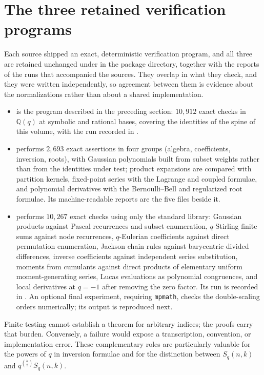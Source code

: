 \documentclass[11pt,a4paper,oneside,openany]{book}
\theoremstyle{definition}
\theoremstyle{remark}
\newcommand{\Q}{\mathbb Q}
\begin{document}
\section{The three retained verification programs}
\label{q3:sec:verifiers}
Each source shipped an exact, deterministic verification program, and all
three are retained unchanged under  in the package
directory, together with the reports of the runs that accompanied the
sources. They overlap in what they check, and they were written
independently, so agreement between them is evidence about the
normalizations rather than about a shared implementation.
\begin{itemize}
\item {} is the program
 described in the preceding section: \(10{,}912\) exact checks in
 \(\Q(q)\) at symbolic and rational bases, covering the identities of the
 spine of this volume, with the run recorded in
 .
\item {} performs
 \(2{,}693\) exact assertions in four groups (algebra, coefficients,
 inversion, roots), with Gaussian polynomials built from subset weights
 rather than from the identities under test; product expansions are compared
 with partition kernels, fixed-point series with the Lagrange and coupled
 formulae, and polynomial derivatives with the Bernoulli--Bell and
 regularized root formulae. Its machine-readable reports are the five
  files beside it.
\item {} performs
 \(10{,}267\) exact checks using only the standard library: Gaussian
 products against Pascal recurrences and subset enumeration,
 \(q\)-Stirling finite sums against node recurrences, \(q\)-Eulerian
 coefficients against direct permutation enumeration, Jackson chain rules
 against barycentric divided differences, inverse coefficients against
 independent series substitution, moments from cumulants against direct
 products of elementary uniform moment-generating series, Lucas evaluations
 as polynomial congruences, and local derivatives at \(q=-1\) after removing
 the zero factor. Its run is recorded in .
 An optional final experiment, requiring \texttt{mpmath}, checks the
 double-scaling orders numerically; its output is reproduced next.
\end{itemize}
Finite testing cannot establish a theorem for arbitrary indices; the proofs
carry that burden. Conversely, a failure would expose a transcription,
convention, or implementation error. These complementary roles are
particularly valuable for the powers of \(q\) in inversion formulae and for
the distinction between \(S_q(n,k)\) and \(q^{\binom k2}S_q(n,k)\).
\end{document}
